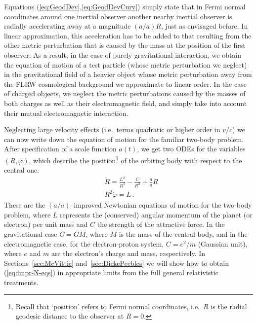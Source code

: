 \documentclass
[rmp,aps,twocolumn,showpacs,preprintnumbers,amsmath,amssymb]{revtex4}
\theoremstyle{plain}
\theoremstyle{definition}
\theoremstyle{remark}
\begin{document}
Equations (\ref{eq:GeodDev},\ref{eq:GeodDevCurv}) simply state that 
in Fermi normal coordinates around one inertial observer another 
nearby inertial observer is radially accelerating away at a magnitude 
$(\ddot a/a)R$, just as envisaged before. In linear approximation, 
this acceleration has to be added to that resulting from the 
other metric perturbation that is caused by the mass at the position 
of the first observer. As a result, in the case of purely gravitational 
interaction, we obtain the equation of motion of a test particle 
(whose metric perturbation we neglect) in the gravitational field 
of a heavier object whose metric perturbation away from the FLRW 
cosmological background we approximate to linear order. 
In the case of charged objects, we neglect the metric 
perturbations caused by the masses of both charges as well as 
their electromagnetic field, and simply take into account their 
mutual electromagnetic interaction. 

Neglecting large velocity effects (i.e.~terms quadratic or higher 
order in $v/c$) we can now write down the equation of motion 
for the familiar two-body problem. After specification of a scale 
function $a(t)$, we get two ODEs for the variables $(R,\varphi)$, which 
describe the position\footnote{Recall that `position' refers to 
Fermi normal coordinates, i.e.~$R$ is the radial geodesic distance 
to the observer at $R=0$.} of the orbiting body with respect to the 
central one:
%
\begin{subequations}\label{eq:impr-N-eqs}
\begin{align}
  \label{eq:r-eq}
  &\ddot{R} = \frac{L^2}{R^3} - \frac{C}{R^2} + \frac{\ddot{a}}{a}R \\
  \label{eq:phi-eq}
  &R^2\dot{\varphi}=L \,.
\end{align}
\end{subequations}
%
These are the $(\ddot a/a)$--improved Newtonian equations of motion
for the two-body problem, where $L$ represents the (conserved) angular 
momentum of the planet (or electron) per unit mass and $C$ the 
strength of the attractive force. In the gravitational case $C=GM$, 
where $M$ is the mass of the central body, and in the electromagnetic 
case, for the electron-proton system, $C=e^2/m$ (Gaussian unit),
where $e$ and $m$ are the electron's charge and mass, respectively.
In Sections~\ref{sec:McVittie} and~\ref{sec:DickePeebles} we will show how 
to obtain (\ref{eq:impr-N-eqs}) in appropriate limits from the full general 
relativistic treatments. 
\end{document}
